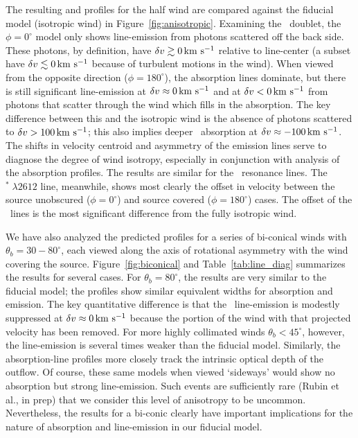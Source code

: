 \documentclass[12pt,preprint]{aastex}
\begin{document}
The resulting  and
 profiles for the half wind are compared against the fiducial model
(isotropic wind) in Figure~\ref{fig:anisotropic}.  
Examining the \mgiid\ doublet, 
the $\phi = 0^\circ$ model only shows
line-emission from photons scattered
off the back side.  These photons, by definition, have $\delta v \gtrsim 0 \, {\rm km~s^{-1}}$
relative to line-center (a subset have $\delta v \lesssim 0 \, {\rm km~s^{-1}}$ because
of turbulent motions in the wind). 
When viewed from the opposite direction ($\phi = 180^\circ$), the
absorption lines dominate, but there is still significant
line-emission at $\delta v \approx 0 \, {\rm km~s^{-1}}$ and at $\delta v < 0 \, {\rm km~s^{-1}}$ 
from photons that scatter through the wind
which fills in the absorption. 
The key difference between this and the isotropic wind is the absence of photons
scattered to $\delta v > 100 \, {\rm km~s^{-1}}$;  this also implies deeper 
\mgiib\ absorption at $\delta v \approx -100 \, {\rm km~s^{-1}}$. The 
shifts in velocity centroid and asymmetry of the emission lines
serve to diagnose the degree of wind isotropy, especially in
conjunction with analysis of the absorption profiles. 
The results are similar for the \feiid\ resonance lines.  The
$^* \; \lambda 2612$ line, meanwhile, shows most clearly the
offset in velocity between the source unobscured ($\phi = 0^\circ$)
and source covered ($\phi = 180^\circ$) cases.  The offset of the
\feiis\ lines is the most significant 
difference from the fully isotropic wind.

We have also analyzed the predicted profiles for a series of bi-conical
winds with $\theta_b = 30-80^\circ$, each viewed along the axis of
rotational asymmetry with the wind covering the
source. Figure~\ref{fig:biconical} and
Table~\ref{tab:line_diag} summarizes the results for several cases.  For
$\theta_b = 80^\circ$, the results are
very similar to the fiducial model;  the profiles show
similar equivalent widths for absorption and emission.  The key
quantitative difference is that the \feiis\ line-emission is
modestly suppressed at $\delta v \approx 0 \, {\rm km~s^{-1}}$ because the portion of the
wind with that projected velocity has been removed.  For
more highly collimated winds
$\theta_b<45^\circ$, however, the
line-emission is several times weaker than the fiducial model.
Similarly, the absorption-line profiles more closely track the
intrinsic optical depth of the outflow.   Of course, these same models
when viewed `sideways' would show no absorption but strong
line-emission.  Such events are sufficiently rare (Rubin et
al., in prep) that we consider this level of anisotropy to be
uncommon.  Nevertheless, the results for a bi-conic clearly have
important implications for the nature of absorption and line-emission
in our fiducial model.
\end{document}

